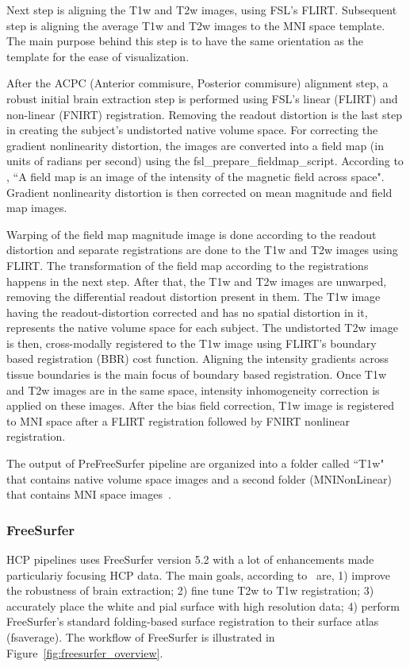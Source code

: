 Next step is aligning the T1w and T2w images, using FSL's FLIRT. Subsequent step is aligning the average T1w and T2w images to the MNI space template. The main purpose behind this step is to have the same orientation as the template for the ease of visualization.

After the ACPC (Anterior commisure, Posterior commisure) alignment step, a robust initial brain extraction step is performed using FSL's linear (FLIRT) and non-linear (FNIRT) registration. Removing the readout distortion is the last step in creating the subject's undistorted native volume space. %
For correcting the gradient nonlinearity distortion, the images are converted into a field map (in units of radians per second) using the fsl\_prepare\_fieldmap\_script. According to \cite{field_map}, ``A field map is an image of the intensity of the magnetic field across space". Gradient nonlinearity distortion is then corrected on mean magnitude and field map images. 

Warping of the field map magnitude image is done according to the readout distortion and separate registrations are done to the T1w and T2w images using FLIRT. The transformation of the field map according to the registrations happens in the next step. After that, the T1w and T2w images are unwarped, removing the differential readout distortion present in them. The T1w image having the readout-distortion corrected and has no spatial distortion in it, represents the native volume space for each subject. The undistorted T2w image is then, cross-modally registered to the T1w image using FLIRT's boundary based registration (BBR) cost function. Aligning the intensity gradients across tissue boundaries is the main focus of boundary based registration. Once T1w and T2w images are in the same space, intensity inhomogeneity correction is applied on these images. After the bias field correction, T1w image is registered to MNI space after a FLIRT registration followed by FNIRT nonlinear registration.

The output of PreFreeSurfer pipeline are organized into a folder called ``T1w" that contains native volume space images and a second folder (MNINonLinear) that contains MNI space images~\cite{Gla13}.

\subsubsection{FreeSurfer}
HCP pipelines uses FreeSurfer version 5.2 with a lot of enhancements made particulariy focusing HCP data. The main goals, according to~\cite{Gla13} are, 1) improve the robustness of brain extraction; 2) fine tune T2w to T1w registration; 3) accurately place the white and pial surface with high resolution data; 4) perform FreeSurfer's standard folding-based surface registration to their surface atlas (fsaverage). The workflow of FreeSurfer is illustrated in Figure~\ref{fig:freesurfer_overview}.

